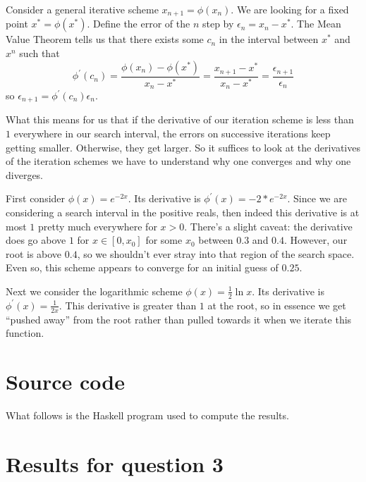 \documentclass[11pt,letterpaper]{article}
\begin{document}
\begin{enumerate}
    Consider a general iterative scheme $x_{n+1} = \phi(x_n)$.
    We are looking for a fixed point $x^* = \phi(x^*)$.
    Define the error of the $n$\th{} step by $\epsilon_n = x_n - x^*$.
    The Mean Value Theorem tells us that there exists some $c_n$ in the
    interval between $x^*$ and $x^n$ such that
    \begin{equation*}
      \phi^\prime(c_n)
      = \frac{\phi(x_n) - \phi(x^*)}{x_n - x^*}
      = \frac{x_{n+1} - x^*}{x_n - x^*}
      = \frac{\epsilon_{n+1}}{\epsilon_n}
    \end{equation*}
    so $\epsilon_{n+1} = \phi^\prime(c_n) \epsilon_n$.

    What this means for us that if the derivative of our iteration scheme is
    less than $1$ everywhere in our search interval, the errors on successive
    iterations keep getting smaller. Otherwise, they get larger.
    So it suffices to look at the derivatives of the iteration schemes we have
    to understand why one converges and why one diverges.

    First consider $\phi(x) = e^{-2x}$.
    Its derivative is $\phi^\prime(x) = -2 * e^{-2x}$.
    Since we are considering a search interval in the positive reals, then
    indeed this derivative is at most $1$ pretty much everywhere for $x > 0$.
    There's a slight caveat: the derivative does go above $1$ for
    $x \in [0, x_0]$ for some $x_0$ between $0.3$ and $0.4$.
    However, our root is above $0.4$, so we shouldn't ever stray into that
    region of the search space.
    Even so, this scheme appears to converge for an initial guess of $0.25$.

    Next we consider the logarithmic scheme
    $\phi(x) = \frac{1}{2} \ln x$.
    Its derivative is $\phi^\prime(x) = \frac{1}{2x}$.
    This derivative is greater than $1$ at the root, so in essence we get
    ``pushed away'' from the root rather than pulled towards it when we iterate
    this function.
\end{enumerate}

\appendix

\section{Source code}

What follows is the Haskell program used to compute the results.



\section{Results for question 3}
\label{app:q3-results}
\end{document}
